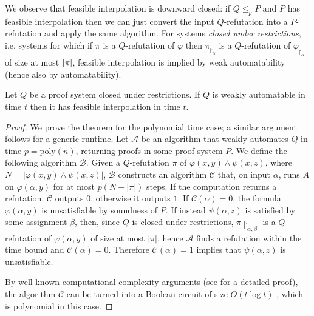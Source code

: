 We observe that feasible interpolation is downward closed: if $Q \leq_p P$ and $P$ has feasible interpolation then we can just convert the input $Q$-refutation into a $P$-refutation and apply the same algorithm. For systems \textit{closed under restrictions}, i.e. systems for which if $\pi$ is a $Q$-refutation of $\varphi$ then $\pi_{\upharpoonright_\alpha}$ is a $Q$-refutation of $\varphi_{\upharpoonright_\alpha}$ of size at most $\left|\pi\right|$, feasible interpolation is implied by weak automatability (hence also by automatability). 

\begin{theorem}
    \label{thm:waut_fi}
    Let $Q$ be a proof system closed under restrictions. If $Q$ is weakly automatable in time $t$ then it has feasible interpolation in time $t$.
\end{theorem}

\begin{proof}
    We prove the theorem for the polynomial time case; a similar argument follows for a generic runtime. Let $\mathcal{A}$ be an algorithm that weakly automates $Q$ in time $p = \mathrm{poly}(n)$, returning proofs in some proof system $P$. We define the following algorithm $\mathcal{B}$. Given a $Q$-refutation $\pi$ of $\varphi(x,y) \land \psi(x,z)$, where $N = |\varphi(x,y) \land \psi(x,z)|$, $\mathcal{B}$ constructs an algorithm $\mathcal{C}$ that, on input $\alpha$, runs $A$ on $\varphi(\alpha,y)$ for at most $p(N + |\pi|)$ steps. If the computation returns a refutation, $\mathcal{C}$ outputs $0$, otherwise it outputs $1$. If $\mathcal{C}(\alpha) = 0$, the formula $\varphi(\alpha, y)$ is unsatisfiable by soundness of $P$. If instead $\psi(\alpha,z)$ is satisfied by some assignment $\beta$, then, since $Q$ is closed under restrictions, $\pi\restriction_{\alpha,\beta}$ is a $Q$-refutation of $\varphi(\alpha,y)$ of size at most $|\pi|$, hence $\mathcal{A}$ finds a refutation within the time bound and $\mathcal{C}(\alpha) = 0$. Therefore $\mathcal{C}(\alpha) = 1$ implies that $\psi(\alpha, z)$ is unsatisfiable.

    By well known computational complexity arguments (see \cite{arora_barak} for a detailed proof), the algorithm $\mathcal{C}$ can be turned into a Boolean circuit of size $O(t \log t)$ \cite{arora_barak, circ_size}, which is polynomial in this case.
\end{proof}

